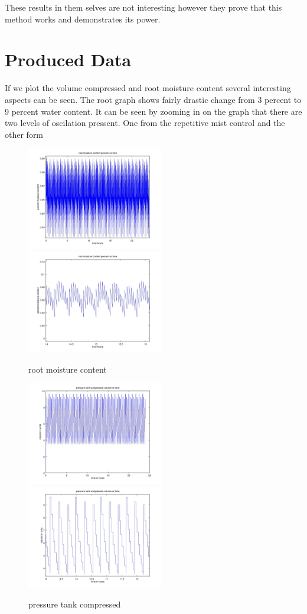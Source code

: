 \documentclass[a4paper,12pt]{article}
\begin{document}
These results in them selves are not interesting however they prove that this method works and demonstrates its power.


\section{Produced Data}

If we plot the volume compressed and root moisture content several interesting aspects can be seen. The root graph shows fairly drastic change from 3 percent to 9 percent water content. It can be seen by zooming in on the graph that there are two levels of oscilation pressent. One from the repetitive mist control and the other form

\begin{figure}[ht!]
	\centering
	\includegraphics[width=60mm]{root_moisture_content_1.jpg}
	\includegraphics[width=60mm]{root_moisture_content_2.jpg}
	\caption{root moisture content}
\end{figure}

\begin{figure}[ht!]
	\centering
	\includegraphics[width=60mm]{pressure_tank_compressed_volume_1.jpg}
	\includegraphics[width=60mm]{pressure_tank_compressed_volume_2.jpg}
	\caption{pressure tank compressed}
\end{figure}
\end{document}
